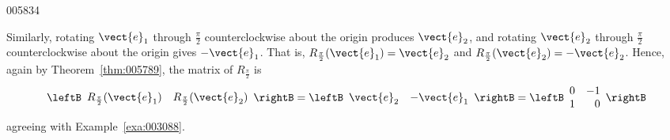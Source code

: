 \begin{example}{}{005834}
\begin{solution}
\hspace*{0.5em} Similarly, rotating $\vect{e}_{1}$ through $\frac{\pi}{2}$ counterclockwise about the origin produces $\vect{e}_{2}$, and rotating $\vect{e}_{2}$ through $\frac{\pi}{2}$ counterclockwise about the origin gives $-\vect{e}_{1}$. That is, $R_{\frac{\pi}{2}}(\vect{e}_{1}) = \vect{e}_{2}$ and $R_{\frac{\pi}{2}}(\vect{e}_{2}) = -\vect{e}_{2}$. Hence, again by Theorem~\ref{thm:005789}, the matrix of $R_{\frac{\pi}{2}}$ is
\begin{equation*}
\leftB \begin{array}{cc}
R_{\frac{\pi}{2}}(\vect{e}_{1}) & R_{\frac{\pi}{2}}(\vect{e}_{2})
\end{array} \rightB = \leftB \begin{array}{rr}
\vect{e}_{2} & -\vect{e}_{1}
\end{array} \rightB = \leftB \begin{array}{rr}
0 & -1 \\
1 & 0
\end{array} \rightB
\end{equation*}
agreeing with Example~\ref{exa:003088}.
\end{solution}
\end{example}

